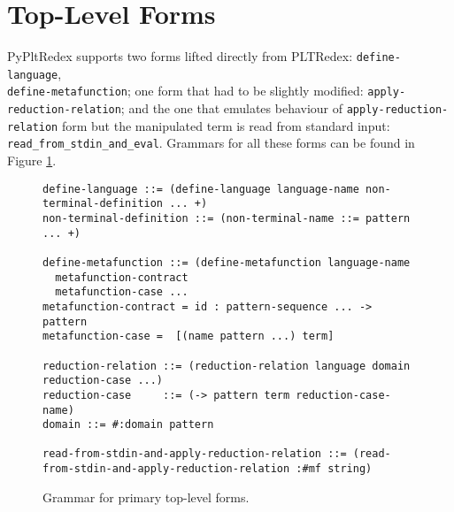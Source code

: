 \section{Top-Level Forms}

PyPltRedex supports two forms lifted directly from PLTRedex: \texttt{define-language}, \\ \texttt{define-metafunction}; one form that had to be slightly modified: \texttt{apply-reduction-relation}; and the one that emulates behaviour of \texttt{apply-reduction-relation} form but the manipulated term is read from standard input: \texttt{read\_from\_stdin\_and\_eval}. Grammars for all these forms can be found in Figure \ref{grammar-tlmain}.

\begin{figure}
\begin{verbatim}
define-language ::= (define-language language-name non-terminal-definition ... +)
non-terminal-definition ::= (non-terminal-name ::= pattern ... +)

define-metafunction ::= (define-metafunction language-name
  metafunction-contract
  metafunction-case ...
metafunction-contract =	id : pattern-sequence ... -> pattern 
metafunction-case =  [(name pattern ...) term] 

reduction-relation ::= (reduction-relation language domain reduction-case ...)
reduction-case     ::= (-> pattern term reduction-case-name)
domain ::= #:domain pattern

read-from-stdin-and-apply-reduction-relation ::= (read-from-stdin-and-apply-reduction-relation :#mf string)
\end{verbatim}
\caption{Grammar for primary top-level forms.}
\label{grammar-tlmain}
\end{figure}

